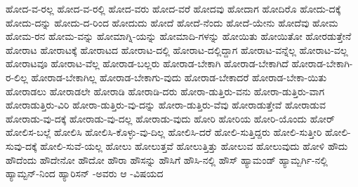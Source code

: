 {ಹೋದ-ವ-ರಲ್ಲ
ಹೋದ-ವ-ರಲ್ಲಿ
ಹೋದ-ವರು
ಹೋದ-ವರೆ
ಹೋದವು
ಹೋದಾಗ
ಹೋದಿರೊ
ಹೋದು-ದಕ್ಕೆ
ಹೋದು-ದನ್ನು
ಹೋದು-ದ-ರಿಂದ
ಹೋದುದು
ಹೋದೆ
ಹೋದೆ-ನೆಂದು
ಹೋದೆ-ಯೇನು
ಹೋದೆವು
ಹೋಮ
ಹೋಮ-ರನ
ಹೋಮ-ವನ್ನು
ಹೋಮಾಗ್ನಿ-ಯನ್ನು
ಹೋಮಾದಿ-ಗಳನ್ನು
ಹೋಯಿತು
ಹೋಯಿತೋ
ಹೋರಡುತ್ತೇನೆ
ಹೋರಾಟ
ಹೋರಾಟಕ್ಕೆ
ಹೋರಾಟದ
ಹೋರಾಟ-ದಲ್ಲಿ
ಹೋರಾಟ-ದಲ್ಲಿದ್ದಾಗ
ಹೋರಾಟ-ವನ್ನೆಲ್ಲ
ಹೋರಾಟ-ವಲ್ಲ
ಹೋರಾಟವೂ
ಹೋರಾಟ-ವೆಲ್ಲ
ಹೋರಾಡ-ಬಲ್ಲರು
ಹೋರಾಡ-ಬೇಕಾಗಿ
ಹೋರಾಡ-ಬೇಕಾಗಿದೆ
ಹೋರಾಡ-ಬೇಕಾಗಿ-ರ-ಲಿಲ್ಲ
ಹೋರಾಡ-ಬೇಕಾಗಿಲ್ಲ
ಹೋರಾಡ-ಬೇಕಾಗು-ವುದು
ಹೋರಾಡ-ಬೇಕಾದರೆ
ಹೋರಾಡ-ಬೇಕಾ-ಯಿತು
ಹೋರಾಡಲು
ಹೋರಾಡಲೇ
ಹೋರಾಡಿ
ಹೋರಾಡಿ-ದರು
ಹೋರಾ-ಡುತ್ತಿರು-ವನು
ಹೋರಾ-ಡುತ್ತಿರು-ವಾಗ
ಹೋರಾಡುತ್ತಿರು-ವಿರಿ
ಹೋರಾ-ಡುತ್ತಿರು-ವು-ದನ್ನು
ಹೋರಾ-ಡುತ್ತಿರು-ವೆವು
ಹೋರಾಡುತ್ತೇವೆ
ಹೋರಾಡುವ
ಹೋರಾಡು-ವು-ದಕ್ಕೆ
ಹೋರಾಡು-ವು-ದಲ್ಲ
ಹೋರಾಡು-ವುದು
ಹೋರಿ
ಹೋರಿಯ
ಹೋರಿ-ಯೊಂದು
ಹೋರ್
ಹೋಲಿಸ-ಬಲ್ಲೆ
ಹೋಲಿಸಿ
ಹೋಲಿಸಿ-ಕೊಳ್ಳು-ವು-ದಿಲ್ಲ
ಹೋಲಿಸಿ-ದರೆ
ಹೋಲಿ-ಸುತ್ತಿದ್ದರು
ಹೋಲಿ-ಸುತ್ತೀರಿ
ಹೋಲಿ-ಸುವು-ದಕ್ಕೆ
ಹೋಲಿ-ಸುವೆ-ಯಲ್ಲ
ಹೋಲು
ಹೋಲುತ್ತವೆ
ಹೋಲುತ್ತಿತ್ತು
ಹೋಲುವ
ಹೋಲುವುದು
ಹೋಳಿ
ಹೌದು
ಹೌದೆಂದು
ಹೌದೇನೋ
ಹೌದೋ
ಹೌರಾ
ಹೌಸನ್ನು
ಹೌಸಿಗೆ
ಹೌಸಿ-ನಲ್ಲಿ
ಹೌಸ್
ಹ್ಯಾಮಂಡ್
ಹ್ಯಾಮ್ಬರ್ಗಿ-ನಲ್ಲಿ
ಹ್ಯಾಮ್ಟನ್-ನಿಂದ
ಹ್ಯಾರಿಸನ್
-ಅವರು
ಆ
-ವಿಷಯದ
}
